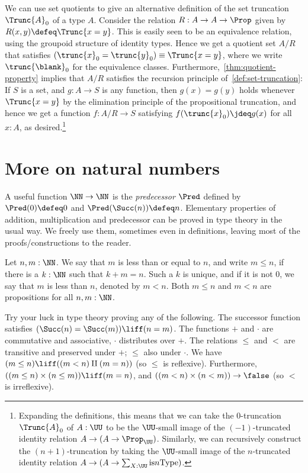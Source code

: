 We can use set quotients to give an alternative definition
of the set truncation $\Trunc{A}_0$ of a type $A$.
Consider the relation $R : A \to A \to \Prop$ given by
$R(x,y) \defeq \Trunc{x=y}$.
This is easily seen to be an equivalence relation,
using the groupoid structure of identity types.
Hence we get a quotient set $A/R$ that satisfies
$(\trunc{x}_0 = \trunc{y}_0) \equiv \Trunc{x=y}$,
where we write $\trunc{\blank}_0$ for the equivalence classes.
Furthermore,~\cref{thm:quotient-property} implies that
$A/R$ satisfies the recursion principle of~\cref{def:set-truncation}:
If $S$ is a set, and $g:A\to S$ is any function,
then $g(x)=g(y)$ holds whenever $\Trunc{x=y}$
by the elimination principle
of the propositional truncation,
and hence we get a function $f : A/R \to S$ satisfying
$f(\trunc{x}_0)\jdeq g(x)$ for all $x:A$, as desired.\footnote{%
  Expanding the definitions,
  this means that we can take the $0$-truncation $\Trunc{A}_0$
  of $A:\UU$ to be the $\UU$-small image
  of the $(-1)$-truncated identity relation
  $A \to (A \to \Prop_\UU)$.
  Similarly, we can recursively construct the $(n+1)$-truncation
  by taking the $\UU$-small image
  of the $n$-truncated identity relation
  $A \to (A \to \sum_{X:\UU}\mathrm{is}{n}\mathrm{Type})$.}

\section{More on natural numbers}
\label{sec:more-on-N}

A useful function $\NN\to\NN$ is the \emph{predecessor} $\Pred$ defined by
$\Pred(0)\defeq 0$ and $\Pred(\Succ(n))\defeq n$.
Elementary properties of addition, multiplication and predecessor
can be proved in type theory in the usual way.
We freely use them, sometimes even in definitions, leaving most of the
proofs/constructions to the reader.

\begin{definition}
\label{def:orderonN}
Let $n,m:\NN$. We say that $m$ is less than or equal to $n$, and write $m\leq n$,
if there is a $k:\NN$ such that $k+m=n$. Such a $k$ is unique, and if it
is not $0$, we say that $m$ is less than $n$, denoted by $m<n$.
Both $m\leq n$ and $m<n$ are propositions for all $n,m:\NN$.
\end{definition}

\begin{xca}\label{xca:try-your-luck-N}
Try your luck in type theory proving any of the following.
The successor function satisfies $(\Succ(n)=\Succ(m))\liff(n=m)$.
The functions $+$ and $\cdot$ are commutative and associative,
$\cdot$ distributes over $+$.
The relations $\leq$ and $<$ are transitive and
preserved under $+$; $\leq$ also under $\cdot$.
We have $(m\leq n) \liff ((m<n)\amalg(m=n))$ (so $\leq$ is reflexive).
Furthermore, $((m\leq n)\times (n\leq m)) \liff (m=n)$,
and $((m<n)\times(n<m))\to\false$ (so $<$ is irreflexive).
\end{xca}

